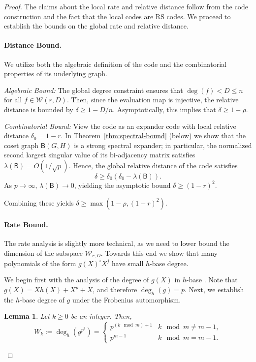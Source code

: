 \documentclass[11pt]{article}
\theoremstyle{plain}
\newtheorem{lemma}[theorem]{Lemma}
\theoremstyle{definition}
\begin{document}
\begin{proof}
The claims about the local rate and relative distance follow from the code construction and the fact that the local codes are RS codes. We proceed to establish the bounds on the global rate and relative distance. 

\paragraph{Distance Bound.}
We utilize both the algebraic definition of the code and the combinatorial properties of its underlying graph.

\textit{Algebraic Bound:} The global degree constraint ensures that $\deg(f) < D\leq n$ for all $f \in \mathcal{W}(r, D)$. Then, since the evaluation map is injective, the relative distance is bounded by $\delta \ge 1 - D/n$. Asymptotically, this implies that $\delta \ge 1-\rho$.

\textit{Combinatorial Bound:} View the code as an expander code with local relative distance $\delta_0 = 1-r$. In Theorem~\ref{thm:spectral-bound} (below) we show that the coset graph $\mathsf{B}(G,H)$ is a strong spectral expander; in particular, the normalized second largest singular value of its bi-adjacency matrix satisfies $\lambda(\mathsf{B}) = O(1/\sqrt{p})$. Hence, the global relative distance of the code satisfies
$$ \delta \ge \delta_0 (\delta_0 - \lambda(\mathsf{B})). $$
As $p \to \infty$, $\lambda(\mathsf{B}) \to 0$, yielding the asymptotic bound $\delta \ge (1-r)^2$.

Combining these yields $\delta \ge \max(1-\rho, (1-r)^2)$.


\paragraph{Rate Bound.}
The rate analysis is slightly more technical, as we need to lower bound  the dimension of the subspace $\mathcal{W}_{r,D}$. Towards this end we show that many polynomials of the form $g(X)^iX^j$ have small $h$-base degree. 

We begin first with the analysis of the degree of $g(X)$ in $h$-base . Note that $g(X) = X h(X) + X^p + X$, and therefore $\deg_h(g)=p.$ Next, we  establish the $h$-base degree of $g$ under  the Frobenius automorphism.

\begin{lemma}
\label{lem:h_degree_of_g_frobenius}
Let $k \ge 0$ be an integer. Then,
\[
W_k:=\deg_h(g^{p^k}) =
\begin{cases}
    p^{(k \mod m) + 1} &  k \mod m \neq m-1, \\
    p^{m-1} & k \mod m = m-1.
\end{cases}
\]
\end{lemma}


\end{proof}
\end{document}
